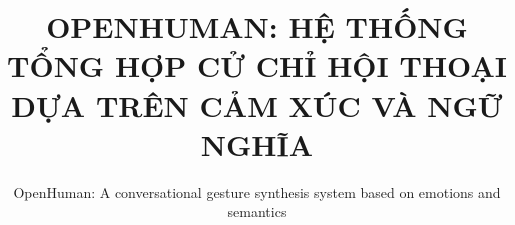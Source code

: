 \documentclass[10pt,mathserif]{beamer}
\title{\large \bfseries OPENHUMAN: HỆ THỐNG TỔNG HỢP CỬ CHỈ HỘI THOẠI DỰA TRÊN CẢM XÚC VÀ NGỮ NGHĨA}
\subtitle{OpenHuman: A conversational gesture synthesis system based on emotions and semantics}
\begin{document}
\begin{frame}[plain]
	\titlepage
\end{frame}


















%

\end{document}

